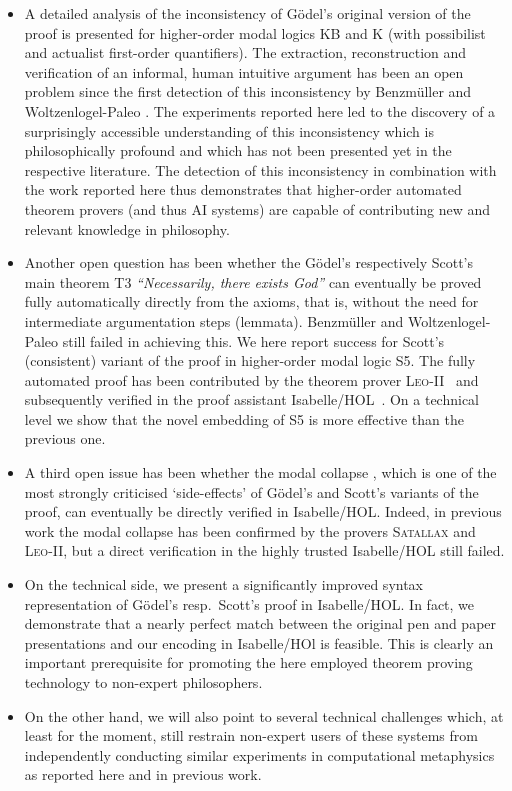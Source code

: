 \documentclass{article}
\begin{document}
\begin{itemize}
\item A detailed analysis of the inconsistency of G\"{o}del's
   original version of the proof is presented
  for higher-order modal logics KB and K (with possibilist and
  actualist first-order quantifiers). The extraction, reconstruction
  and verification of an informal, human intuitive argument has been
  an open problem since the first detection of this inconsistency by
  Benzmüller and Woltzenlogel-Paleo . The experiments
  reported here led to the discovery of a surprisingly accessible
  understanding of this inconsistency which is philosophically
  profound and which has not been presented yet in the respective
  literature. The detection of this inconsistency in combination with
  the work reported here thus demonstrates that higher-order automated
  theorem provers (and thus AI systems) are capable of contributing
  new and relevant knowledge in philosophy. 
\item Another open question has been whether the G\"odel's
  respectively Scott's main theorem T3 \textit{``Necessarily, there
    exists God''} can eventually be proved fully automatically
  directly from the axioms, that is, without the need for intermediate
  argumentation steps (lemmata). Benzm\"uller and Woltzenlogel-Paleo
   still failed in achieving this. We here report
  success for Scott's (consistent) variant of the proof in
  higher-order modal logic S5. The fully automated proof has been
  contributed by the theorem prover \textsc{Leo-II}~\cite{C26} and
  subsequently verified in the proof assistant
  Isabelle/HOL~\cite{NPW02}. On a technical level we show that the
  novel embedding of S5 is more effective than the previous one.
\item A third open issue has been whether the modal
  collapse \cite{Sobel}, which is one of the most strongly criticised
  `side-effects' of G\"odel's and Scott's variants of the proof, can
  eventually be directly verified in Isabelle/HOL. Indeed, in previous work
  the modal collapse has been confirmed by the provers
  \textsc{Satallax} \cite{Satallax} and \textsc{Leo-II}, but a
  direct verification in the highly trusted Isabelle/HOL still failed.
\item On the technical side, we present a significantly improved
  syntax representation of G\"odel's resp.~Scott's proof in
  Isabelle/HOL. In fact, we demonstrate that a nearly perfect match
  between the original pen and paper presentations and our encoding in
  Isabelle/HOl is feasible. This is clearly an important prerequisite
  for promoting the here employed theorem proving technology to
  non-expert philosophers.
\item On the other hand, we will
  also point to several technical challenges which, at least for the
  moment, still restrain non-expert users of these systems from
  independently conducting similar experiments in computational
  metaphysics as reported here and in previous work. 
\end{itemize}
\end{document}
